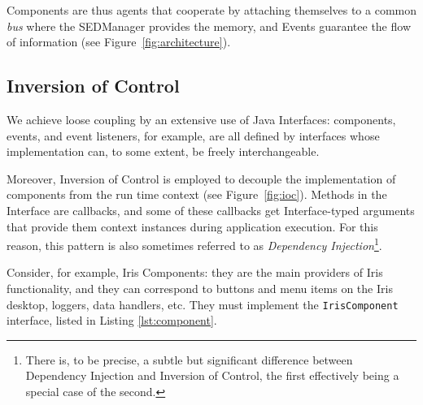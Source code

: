 \documentclass[preprint,authoryear,5p]{elsarticle}
\begin{document}
Components are thus agents that cooperate by attaching themselves to a common
\emph{bus} where the SEDManager provides the memory, and Events guarantee the
flow of information (see Figure~\ref{fig:architecture}).

\subsection{Inversion of Control}

We achieve loose coupling by an extensive use of Java Interfaces: components,
events, and event listeners, for example, are all defined by interfaces whose
implementation can, to some extent, be freely interchangeable.

Moreover, Inversion of Control is employed to decouple
the implementation of components from the run time context (see Figure~\ref{fig:ioc}). 
Methods in the
Interface are callbacks, and some of these callbacks get Interface-typed
arguments that provide them context instances during application execution.
For this reason, this pattern is also sometimes referred to as \emph{Dependency
Injection}\footnote{There is, to be precise, a subtle but significant difference
between Dependency Injection and Inversion of Control, the first effectively
being a special case of the second.}.

Consider, for example, Iris Components: they are the main providers of Iris
functionality, and they can correspond to buttons and menu items on the Iris
desktop, loggers, data handlers, etc. They must implement the \texttt{IrisComponent}
interface, listed in Listing \ref{lst:component}.
\end{document}
